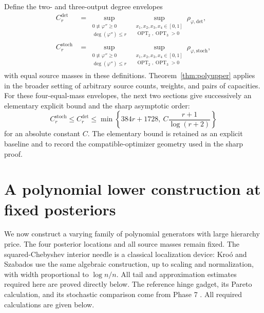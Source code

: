 \documentclass[11pt]{article}
\theoremstyle{definition}\newtheorem{definition}[theorem]{Definition}
\theoremstyle{remark}\newtheorem{remark}[theorem]{Remark}
\newcommand{\ph}{\varphi}
\newcommand{\OPT}{\operatorname{OPT}}
\newcommand{\detp}{\mathrm{det}}
\newcommand{\stp}{\mathrm{stoch}}
\begin{document}
Define the two- and three-output degree envelopes
\begin{align}
C_r^{\detp}&=\sup_{\substack{0\not\equiv\ph''\ge0\\\deg(\ph'')\le r}}
\ \sup_{\substack{x_1,x_2,x_3,x_4\in[0,1]\\\OPT_2,\OPT_3>0}}
\rho_{\ph,\detp},\label{eq:envelope}\\
C_r^{\stp}&=\sup_{\substack{0\not\equiv\ph''\ge0\\\deg(\ph'')\le r}}
\ \sup_{\substack{x_1,x_2,x_3,x_4\in[0,1]\\\OPT_2,\OPT_3>0}}
\rho_{\ph,\stp},\nonumber
\end{align}
with equal source masses in these definitions. Theorem~\ref{thm:polyupper} applies in the broader setting of arbitrary source counts, weights, and pairs of capacities. For these four-equal-mass envelopes, the next two sections give successively an elementary explicit bound and the sharp asymptotic order:
\begin{equation}
C_r^{\stp}\le C_r^{\detp}
\le \min\left\{384r+1728,\ C\frac{r+1}{\log(r+2)}\right\}
\label{eq:envelopeupper}
\end{equation}
for an absolute constant $C$. The elementary bound is retained as an explicit baseline and to record the compatible-optimizer geometry used in the sharp proof.




\section{A polynomial lower construction at fixed posteriors}
\label{sec:lower}
We now construct a varying family of polynomial generators with large hierarchy price. The four posterior locations and all source masses remain fixed. The squared-Chebyshev interior needle is a classical localization device: Kro\'o and Szabados \cite[Proposition 1 and its proof]{krooszabados} use the same algebraic construction, up to scaling and normalization, with width proportional to $\log n/n$. All tail and approximation estimates required here are proved directly below. The reference hinge gadget, its Pareto calculation, and its stochastic comparison come from Phase 7 \cite[Section 4]{huang7}. All required calculations are given below.
\end{document}
